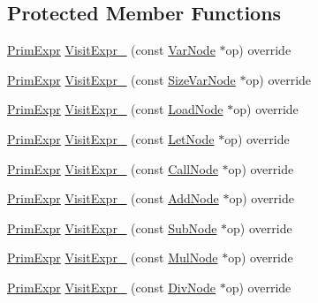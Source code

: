 \subsection*{Protected Member Functions}
\begin{DoxyCompactItemize}
\item 
\hyperlink{classtvm_1_1PrimExpr}{Prim\+Expr} \hyperlink{classtvm_1_1tir_1_1ExprMutator_af6e722273818f70d0894aeecd1b55615}{Visit\+Expr\+\_\+} (const \hyperlink{classtvm_1_1tir_1_1VarNode}{Var\+Node} $\ast$op) override
\item 
\hyperlink{classtvm_1_1PrimExpr}{Prim\+Expr} \hyperlink{classtvm_1_1tir_1_1ExprMutator_ade08e1786bce8d1cb220d3f54f3fbfeb}{Visit\+Expr\+\_\+} (const \hyperlink{classtvm_1_1tir_1_1SizeVarNode}{Size\+Var\+Node} $\ast$op) override
\item 
\hyperlink{classtvm_1_1PrimExpr}{Prim\+Expr} \hyperlink{classtvm_1_1tir_1_1ExprMutator_af195e0234cba3ed03d36b04a03d3e0e0}{Visit\+Expr\+\_\+} (const \hyperlink{classtvm_1_1tir_1_1LoadNode}{Load\+Node} $\ast$op) override
\item 
\hyperlink{classtvm_1_1PrimExpr}{Prim\+Expr} \hyperlink{classtvm_1_1tir_1_1ExprMutator_ae1c5c9652137783b1d0636b2837143aa}{Visit\+Expr\+\_\+} (const \hyperlink{classtvm_1_1tir_1_1LetNode}{Let\+Node} $\ast$op) override
\item 
\hyperlink{classtvm_1_1PrimExpr}{Prim\+Expr} \hyperlink{classtvm_1_1tir_1_1ExprMutator_a7fd8ced88ccf3bc75447d27154596962}{Visit\+Expr\+\_\+} (const \hyperlink{classtvm_1_1tir_1_1CallNode}{Call\+Node} $\ast$op) override
\item 
\hyperlink{classtvm_1_1PrimExpr}{Prim\+Expr} \hyperlink{classtvm_1_1tir_1_1ExprMutator_a74b0abe37c0d7c5829744219274e9b98}{Visit\+Expr\+\_\+} (const \hyperlink{classtvm_1_1tir_1_1AddNode}{Add\+Node} $\ast$op) override
\item 
\hyperlink{classtvm_1_1PrimExpr}{Prim\+Expr} \hyperlink{classtvm_1_1tir_1_1ExprMutator_a9818e8f5c5e9e438e826b68adc0da578}{Visit\+Expr\+\_\+} (const \hyperlink{classtvm_1_1tir_1_1SubNode}{Sub\+Node} $\ast$op) override
\item 
\hyperlink{classtvm_1_1PrimExpr}{Prim\+Expr} \hyperlink{classtvm_1_1tir_1_1ExprMutator_ab65cea9aab1ba22666e48e4fe3bc26e1}{Visit\+Expr\+\_\+} (const \hyperlink{classtvm_1_1tir_1_1MulNode}{Mul\+Node} $\ast$op) override
\item 
\hyperlink{classtvm_1_1PrimExpr}{Prim\+Expr} \hyperlink{classtvm_1_1tir_1_1ExprMutator_a6c9481c2567c16e9dc7ca0a9551cc5ae}{Visit\+Expr\+\_\+} (const \hyperlink{classtvm_1_1tir_1_1DivNode}{Div\+Node} $\ast$op) override

\end{DoxyCompactItemize}
